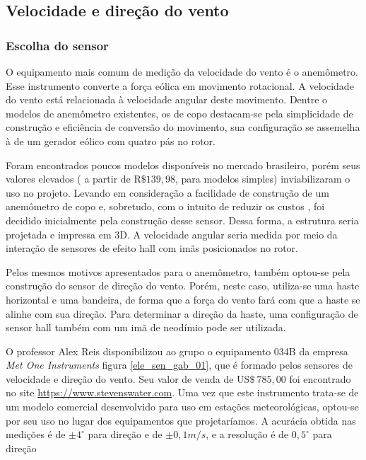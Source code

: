 	\subsection{Velocidade e direção do vento}

		\subsubsection{Escolha do sensor}

		O equipamento mais comum de medição da velocidade do vento é o anemômetro. Esse instrumento converte a força eólica em movimento rotacional. A velocidade do vento está relacionada à velocidade angular deste movimento. Dentre o modelos de anemômetro existentes, os de copo destacam-se pela simplicidade de construção e eficiência de conversão do movimento, sua configuração se assemelha à de um gerador eólico com quatro pás no rotor.

		Foram encontrados poucos modelos disponíveis no mercado brasileiro, porém seus valores elevados ( a partir de R$\$ 139,98$, para modelos simples) inviabilizaram o uso no projeto. Levando em consideração a facilidade de construção de um anemômetro de copo e, sobretudo, com o intuito de reduzir os custos , foi  decidido inicialmente pela construção desse sensor. Dessa forma, a estrutura seria projetada e impressa em 3D. A velocidade angular seria medida por meio da interação de sensores de efeito hall  com imãs posicionados no rotor.

		Pelos mesmos motivos apresentados para o anemômetro, também optou-se pela construção do sensor de direção do vento. Porém, neste caso, utiliza-se uma haste horizontal e uma bandeira, de forma que a força do vento fará com que a haste se alinhe com sua direção. Para determinar a direção da haste, uma configuração de sensor hall também com um imã de neodímio pode ser utilizada. 
		
		O professor Alex Reis disponibilizou ao grupo o equipamento 034B da empresa \emph{Met One Instruments} figura \ref{ele_sen_gab_01}, que é formado pelos sensores de velocidade e direção do vento. Seu valor de venda de US$\$~785,00$  foi encontrado no site \url{https://www.stevenswater.com}. Uma vez que este instrumento trata-se de um modelo comercial desenvolvido para uso em estações meteorológicas, optou-se por seu uso no lugar dos equipamentos que projetaríamos. A acurácia obtida nas medições é de $\pm 4^{\circ}$ para direção e de $\pm 0,1 m/s$, e a resolução é de $0,5^{\circ}$ para direção 
		
